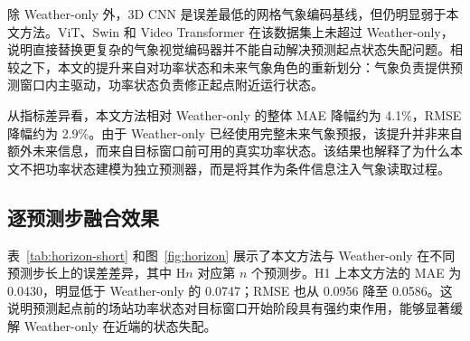 
除 Weather-only 外，3D CNN 是误差最低的网格气象编码基线，但仍明显弱于本文方法。ViT、Swin 和 Video Transformer 在该数据集上未超过 Weather-only，说明直接替换更复杂的气象视觉编码器并不能自动解决预测起点状态失配问题。相较之下，本文的提升来自对功率状态和未来气象角色的重新划分：气象负责提供预测窗口内主驱动，功率状态负责修正起点附近运行状态。

从指标差异看，本文方法相对 Weather-only 的整体 MAE 降幅约为 4.1\%，RMSE 降幅约为 2.9\%。由于 Weather-only 已经使用完整未来气象预报，该提升并非来自额外未来信息，而来自目标窗口前可用的真实功率状态。该结果也解释了为什么本文不把功率状态建模为独立预测器，而是将其作为条件信息注入气象读取过程。

\subsection{逐预测步融合效果}

表~\ref{tab:horizon-short} 和图~\ref{fig:horizon} 展示了本文方法与 Weather-only 在不同预测步长上的误差差异，其中 H\(n\) 对应第 \(n\) 个预测步。H1 上本文方法的 MAE 为 0.0430，明显低于 Weather-only 的 0.0747；RMSE 也从 0.0956 降至 0.0586。这说明预测起点前的场站功率状态对目标窗口开始阶段具有强约束作用，能够显著缓解 Weather-only 在近端的状态失配。


